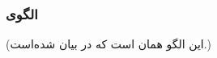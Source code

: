 \subsubsection{الگوی }
\label{resourceSimLockingSec}
\begin{RTL}
(این الگو همان  است
که در \cite{ref1} بیان شده‌است.)
\end{RTL}